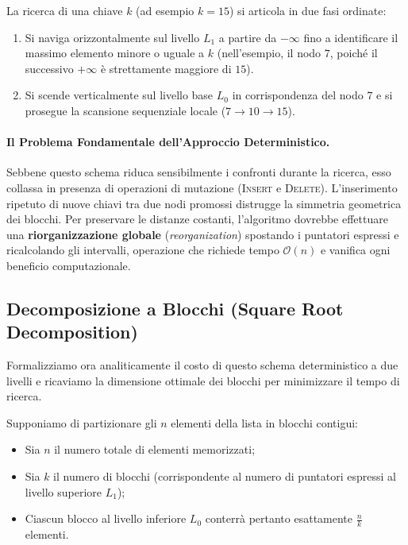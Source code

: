 La ricerca di una chiave $k$ (ad esempio $k = 15$) si articola in due fasi ordinate:
\begin{enumerate}
  \item Si naviga orizzontalmente sul livello $L_1$ a partire da $-\infty$ fino a identificare il massimo elemento minore o uguale a $k$ (nell'esempio, il nodo $7$, poiché il successivo $+\infty$ è strettamente maggiore di $15$).
  \item Si scende verticalmente sul livello base $L_0$ in corrispondenza del nodo $7$ e si prosegue la scansione sequenziale locale ($7 \to 10 \to 15$).
\end{enumerate}

\paragraph{Il Problema Fondamentale dell'Approccio Deterministico.}
Sebbene questo schema riduca sensibilmente i confronti durante la ricerca, esso collassa in presenza di operazioni di mutazione (\textsc{Insert} e \textsc{Delete}). L'inserimento ripetuto di nuove chiavi tra due nodi promossi distrugge la simmetria geometrica dei blocchi. Per preservare le distanze costanti, l'algoritmo dovrebbe effettuare una \textbf{riorganizzazione globale} (\textit{reorganization}) spostando i puntatori espressi e ricalcolando gli intervalli, operazione che richiede tempo $\mathcal{O}(n)$ e vanifica ogni beneficio computazionale.

\FloatBarrier
\subsection{Decomposizione a Blocchi (Square Root Decomposition)}
Formalizziamo ora analiticamente il costo di questo schema deterministico a due livelli e ricaviamo la dimensione ottimale dei blocchi per minimizzare il tempo di ricerca.

Supponiamo di partizionare gli $n$ elementi della lista in blocchi contigui:
\begin{itemize}
  \item Sia $n$ il numero totale di elementi memorizzati;
  \item Sia $k$ il numero di blocchi (corrispondente al numero di puntatori espressi al livello superiore $L_1$);
  \item Ciascun blocco al livello inferiore $L_0$ conterrà pertanto esattamente $\frac{n}{k}$ elementi.
\end{itemize}

